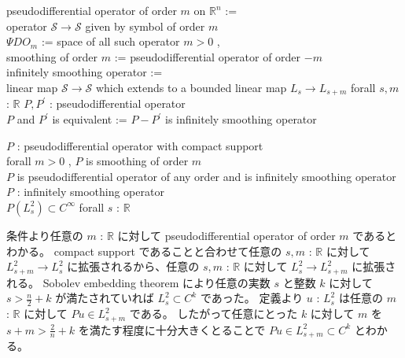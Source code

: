 

\begin{Definition}
\itemdefi
  \Define pseudodifferential operator of order \(m\) on \(\mathbb{R}^n\) := \\
  operator \(\mathscr{S} \to \mathscr{S}\) given by symbol of order \(m\) \\
  \Define \(\Psi DO_m\) := space of all such operator
\itemdefi
  \For \(m > 0\) , \\
  \Define smoothing of order \(m\) := pseudodifferential operator of order \(- m\) \\
  \Define infinitely smoothing operator := \\
  linear map \(\mathscr{S} \to \mathscr{S}\) which extends to a bounded linear map \(L_s \to L_{s+m}\) forall \(s,m\) : \(\mathbb{R}\)
\itemdefi
  \For \(P , P^{\prime}\) : pseudodifferential operator \\
  \Define \(P\) and \(P^{\prime}\) is equivalent := \(P-P^{\prime}\) is infinitely smoothing operator
\end{Definition}

\begin{Theorem}
\itemprop
  \For \(P\) : pseudodifferential operator with compact support \\
  \IfHold forall \(m > 0\) , \(P\) is smoothing of order \(m\) \\
  \Then \(P\) is pseudodifferential operator of any order and is infinitely smoothing operator
\itemprop
  \For \(P\) : infinitely smoothing operator \\
  \Then \(P(L^2_s) \subset C^\infty\) forall \(s\) : \(\mathbb{R}\)
\end{Theorem}

\begin{Proof}
\itemprof
  条件より任意の \(m\) : \(\mathbb{R}\) に対して pseudodifferential operator of order \(m\) であるとわかる。
  compact support であることと合わせて任意の \(s,m\) : \(\mathbb{R}\) に対して \(L^2_{s+m} \to L^2_{s}\) に拡張されるから、任意の \(s,m\) : \(\mathbb{R}\) に対して  \(L^2_{s} \to L^2_{s+m}\) に拡張される。
\itemprof
  Sobolev embedding theorem により任意の実数 \(s\) と整数 \(k\) に対して \(s > \frac{n}{2} + k\) が満たされていれば \(L^2_s \subset C^k\) であった。
  定義より \(u\) : \(L^2_{s}\) は任意の \(m\) : \(\mathbb{R}\) に対して \(P u \in L^2_{s + m}\) である。
  したがって任意にとった \(k\) に対して \(m\) を \(s + m > \frac{2}{n} + k\) を満たす程度に十分大きくとることで \(P u \in L^2_{s + m} \subset C^k\) とわかる。
\end{Proof}

